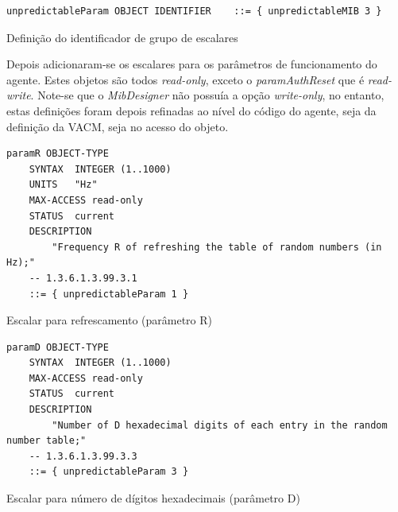 \begin{center}
 	
\begin{verbatim}
unpredictableParam OBJECT IDENTIFIER 	::= { unpredictableMIB 3 }
\end{verbatim}
 	\captionsetup{type=figure, width=0.8\linewidth}
	\caption{Definição do identificador de grupo de escalares}
\label{fig:fasea:groupid} 
\end{center}

\newpage
Depois adicionaram-se os escalares para os parâmetros de funcionamento do
agente. Estes objetos são todos \emph{read-only}, exceto o \emph{paramAuthReset}
que é \emph{read-write}. Note-se que o \emph{MibDesigner} não possuía a opção
\emph{write-only}, no entanto, estas definições foram depois refinadas ao nível
do código do agente, seja da definição da VACM, seja no acesso do objeto.


\begin{center}
 	
\begin{verbatim}
paramR OBJECT-TYPE
	SYNTAX  INTEGER (1..1000)
	UNITS	"Hz"
	MAX-ACCESS read-only
	STATUS  current
	DESCRIPTION
		"Frequency R of refreshing the table of random numbers (in Hz);"
	-- 1.3.6.1.3.99.3.1
	::= { unpredictableParam 1 }
\end{verbatim}
 	\captionsetup{type=figure, width=0.8\linewidth}
	\caption{Escalar para refrescamento (parâmetro R)}
\label{fig:fasea:} 
\end{center}

\begin{center}
 	
\begin{verbatim}
paramD OBJECT-TYPE
	SYNTAX  INTEGER (1..1000)
	MAX-ACCESS read-only
	STATUS  current
	DESCRIPTION
		"Number of D hexadecimal digits of each entry in the random number table;"
	-- 1.3.6.1.3.99.3.3
	::= { unpredictableParam 3 }
\end{verbatim}
 	\captionsetup{type=figure, width=0.8\linewidth}
	\caption{Escalar para número de dígitos hexadecimais (parâmetro D)}
\label{fig:fasea:} 
\end{center}


